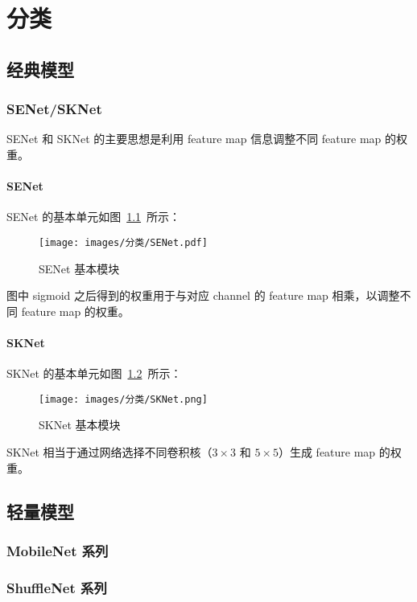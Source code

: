 \part{分类}

\chapter{经典模型}

\section{SENet/SKNet}
SENet 和 SKNet 的主要思想是利用 feature map 信息调整不同 feature map 的权重。

\subsection{SENet}
\label{subsec:SENet}
SENet 的基本单元如图~\ref{fig:senet}~所示：

\begin{figure}[ht]
  \centering
  \texttt{[image: images/分类/SENet.pdf]}
  \caption{SENet 基本模块}
  \label{fig:senet}
\end{figure}

图中 sigmoid 之后得到的权重用于与对应 channel 的 feature map 相乘，以调整不
同 feature map 的权重。

\subsection{SKNet}
SKNet 的基本单元如图~\ref{fig:sknet}~所示：

\begin{figure}[ht]
  \centering
  \texttt{[image: images/分类/SKNet.png]}
  \caption{SKNet 基本模块}
  \label{fig:sknet}
\end{figure}

SKNet 相当于通过网络选择不同卷积核（$3 \times 3$ 和 $5 \times 5$）生成 feature
map 的权重。

\chapter{轻量模型}

\section{MobileNet 系列}

\section{ShuffleNet 系列}
